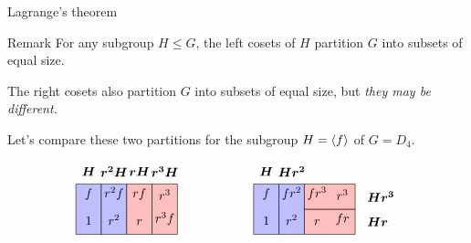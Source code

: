 \documentclass[8pt, handout]{beamer}
\newcommand{\Pause}{\pause}      %
\begin{document}
\begin{frame}{Lagrange's theorem}

  \begin{alertblock}{Remark}
    For any subgroup $H\leq G$, the left cosets of $H$ partition
    $G$ into subsets of equal size. \medskip\Pause
    
    The right cosets also partition $G$ into subsets of
    equal size, but \emph{they may be different.}
  \end{alertblock}
  
  \medskip\Pause
  
  Let's compare these two partitions for the subgroup $H=\langle f\rangle$ of $G=D_4$.

  \[
  \begin{tikzpicture}[scale=.7]
    \begin{scope}[shift={(0,0)}]
      \draw[thin,fill=boxBlue] (0,0) rectangle (1,2);
      \draw[thin,fill=boxBlue] (1,0) rectangle (2,2);
      \draw[thin,fill=boxRed] (2,0) rectangle (3,2);
      \draw[thin,fill=boxRed] (3,0) rectangle (4,2);
      \node at (.5,2.5) {$\bm{H}$}; \node at (1.5,2.5) {$\bm{r^2H}$};
      \node at (2.5,2.5) {$\bm{rH}$}; \node at (3.5,2.5) {$\bm{r^3H}$}; 
      \node[anchor=south] at (.5,.20) {$1$};
      \node[anchor=south] at (.5,1.20) {$f$};
      \node[anchor=south] at (1.5,.20) {$r^2$};
      \node[anchor=south] at (1.5,1.20) {$r^2f$};
      \node[anchor=south] at (2.5,.20) {$r$};
      \node[anchor=south] at (2.5,1.20) {$rf$};
      \node[anchor=south] at (3.5,.20) {$r^3f$};
      \node[anchor=south] at (3.5,1.20) {$r^3$};
    \end{scope}
    \begin{scope}[shift={(7,0)}]
      \draw[thin,fill=boxBlue] (0,0) rectangle (1,2);
      \draw[thin,fill=boxBlue] (1,0) rectangle (2,2);
      \draw[thin,fill=boxRed] (2,0) rectangle (4,1);
      \draw[thin,fill=boxRed] (2,1) rectangle (4,2);
      \node at (.5,2.5) {$\bm{H}$}; \node at (1.5,2.5) {$\bm{Hr^2}$};
      \node[anchor=west] at (4.3,1.5) {$\bm{Hr^3}$}; 
      \node[anchor=west] at (4.3,.5) {$\bm{Hr}$};
      \node[anchor=south] at (.5,.20) {$1$};
      \node[anchor=south] at (.5,1.20) {$f$};
      \node[anchor=south] at (1.5,.20) {$r^2$};
      \node[anchor=south] at (1.5,1.20) {$fr^2$};
      \node[anchor=south] at (2.5,.20) {$r$};
      \node[anchor=south] at (2.5,1.20) {$fr^3$};
      \node[anchor=south] at (3.5,.20) {$fr$};
      \node[anchor=south] at (3.5,1.20) {$r^3$};
    \end{scope}
  \end{tikzpicture}
  \]


\end{frame}
\end{document}
